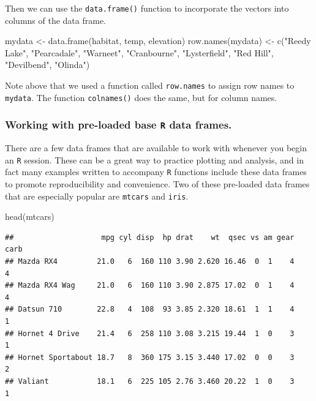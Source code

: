 \documentclass[
]{book}
\newenvironment{Shaded}{\begin{snugshade}}{\end{snugshade}}
\newcommand{\FunctionTok}[1]{\textcolor[rgb]{0.00,0.00,0.00}{#1}}
\newcommand{\NormalTok}[1]{#1}
\newcommand{\OtherTok}[1]{\textcolor[rgb]{0.56,0.35,0.01}{#1}}
\newcommand{\StringTok}[1]{\textcolor[rgb]{0.31,0.60,0.02}{#1}}
\begin{document}
Then we can use the \texttt{data.frame()} function to incorporate the vectors into columns of the data frame.

\begin{Shaded}
\begin{Highlighting}[]
\NormalTok{mydata }\OtherTok{\textless{}{-}} \FunctionTok{data.frame}\NormalTok{(habitat, temp, elevation)}
\FunctionTok{row.names}\NormalTok{(mydata) }\OtherTok{\textless{}{-}} \FunctionTok{c}\NormalTok{(}\StringTok{"Reedy Lake"}\NormalTok{, }\StringTok{"Pearcadale"}\NormalTok{, }\StringTok{"Warneet"}\NormalTok{, }\StringTok{"Cranbourne"}\NormalTok{, }
                       \StringTok{"Lysterfield"}\NormalTok{, }\StringTok{"Red Hill"}\NormalTok{, }\StringTok{"Devilbend"}\NormalTok{, }\StringTok{"Olinda"}\NormalTok{)}
\end{Highlighting}
\end{Shaded}

Note above that we used a function called \texttt{row.names} to assign row names to \texttt{mydata}. The function \texttt{colnames()} does the same, but for column names.

\hypertarget{working-with-pre-loaded-base-r-data-frames.}{%
\subsubsection{\texorpdfstring{Working with pre-loaded base \texttt{R} data frames.}{Working with pre-loaded base R data frames.}}\label{working-with-pre-loaded-base-r-data-frames.}}

There are a few data frames that are available to work with whenever you begin an \texttt{R} session. These can be a great way to practice plotting and analysis, and in fact many examples written to accompany \texttt{R} functions include these data frames to promote reproducibility and convenience. Two of these pre-loaded data frames that are especially popular are \texttt{mtcars} and \texttt{iris}.

\begin{Shaded}
\begin{Highlighting}[]
\FunctionTok{head}\NormalTok{(mtcars)}
\end{Highlighting}
\end{Shaded}

\begin{verbatim}
##                    mpg cyl disp  hp drat    wt  qsec vs am gear carb
## Mazda RX4         21.0   6  160 110 3.90 2.620 16.46  0  1    4    4
## Mazda RX4 Wag     21.0   6  160 110 3.90 2.875 17.02  0  1    4    4
## Datsun 710        22.8   4  108  93 3.85 2.320 18.61  1  1    4    1
## Hornet 4 Drive    21.4   6  258 110 3.08 3.215 19.44  1  0    3    1
## Hornet Sportabout 18.7   8  360 175 3.15 3.440 17.02  0  0    3    2
## Valiant           18.1   6  225 105 2.76 3.460 20.22  1  0    3    1
\end{verbatim}
\end{document}
